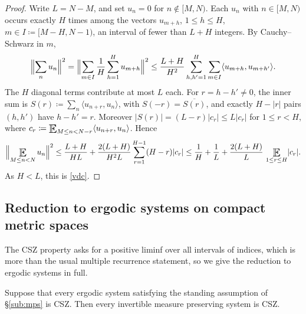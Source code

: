 \begin{proof}
Write $L = N-M$, and set $u_n = 0$ for $n \notin [M,N)$.  Each $u_n$ with $n \in [M,N)$ occurs exactly $H$ times among the vectors $u_{m+h}$, 
$1 \leq h \leq H$, $m \in I \coloneqq [M-H, N-1)$, an interval of fewer than $L+H$ integers.  By Cauchy--Schwarz in $m$, 
\begin{equation}
\Bigl\lVert \sum_{n} u_n \Bigr\rVert ^2 
= \Bigl\lVert \sum _{m \in I} \frac 1H \sum _{h=1}^H u_{m+h} \Bigr\rVert ^2 
\leq \frac{L+H}{H^2} \sum _{h,h'=1}^H \sum _{m \in I} \langle u_{m+h}, u_{m+h'} \rangle . 
\end{equation}
The $H$ diagonal terms contribute at most $L$ each.  For $r = h-h' \neq 0$, the inner sum is 
$S(r) \coloneqq \sum _{n} \langle u_{n+r}, u_n\rangle$, with $S(-r) = \overline{S(r)}$, and exactly $H - \lvert r\rvert$ pairs $(h,h')$ have $h-h'=r$.  
Moreover $\lvert S(r)\rvert = (L-r) \lvert c_r\rvert \leq L \lvert c_r\rvert$ for $1 \leq r <H$, where $c_r \coloneqq \Expectation_{M\leq n<N-r}\langle u_{n+r},u_n\rangle$.  Hence 
\begin{equation}
\Bigl\lVert \Expectation_{M\leq n<N} u_n \Bigr\rVert ^2 
\leq \frac{L+H}{HL} + \frac{2(L+H)}{H^2 L} \sum _{r=1}^{H-1} (H-r) \lvert c_r\rvert 
\leq \frac 1H + \frac 1L + \frac{2(L+H)}{L}\, \Expectation_{1\leq r\leq H} \lvert c_r\rvert . 
\end{equation}
As $H < L$, this is \eqref{vdc}. 
\end{proof}


\subsection{Reduction to ergodic systems on compact metric spaces} \label{sub:reduction}

The CSZ property asks for a positive liminf over all intervals of indices, which is more than the usual multiple recurrence statement, 
so we give the reduction to ergodic systems in full.  

\begin{proposition} \label{p:reduction}
Suppose that every ergodic system satisfying the standing assumption of \S\ref{sub:mps} is CSZ.  Then every invertible measure preserving system is CSZ.  
\end{proposition}

